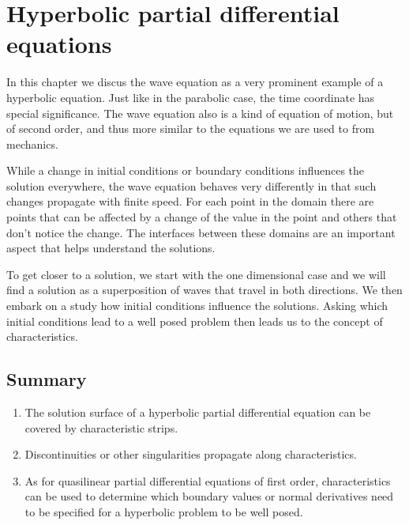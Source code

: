 %
%
%
\chapter{Hyperbolic partial differential equations
\label{chapter-hyperbolisch}}
\rhead{}
In this chapter we discus the wave equation as a very prominent
example of a hyperbolic equation.
Just like in the parabolic case, the time coordinate has special
significance.
The wave equation also is a kind of equation of motion, but of second
order, and thus more similar to the equations we are used to from
mechanics.

While a change in initial conditions or boundary conditions 
influences the solution everywhere, the wave equation behaves
very differently in that such changes propagate with finite speed.
For each point in the domain there are points that can be affected
by a change of the value in the point and others that don't notice
the change.
The interfaces between these domains are an important aspect that
helps understand the solutions.

To get closer to a solution, we start with the one dimensional case
and we will find a solution as a superposition of waves that travel in
both directions.
We then embark on a study how initial conditions influence the solutions.
Asking which initial conditions lead to a well posed problem then
leads us to the concept of characteristics.









\section{Summary}
\begin{enumerate}
\item
The solution surface of a hyperbolic partial differential equation can be
covered by characteristic strips.
\item
Discontinuities or other singularities propagate along characteristics.
\item
As for quasilinear partial differential equations of first order,
characteristics can be used to determine which boundary values or
normal derivatives need to be specified for a hyperbolic problem to
be well posed.
\end{enumerate}

